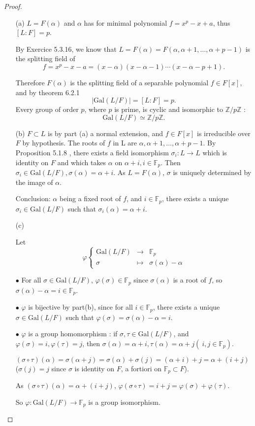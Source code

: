 \documentclass[11pt,a4paper]{article}
\newcommand{\Z}{\mathbb{Z}}
\newcommand{\F}{\mathbb{F}}
\newcommand{\Gal}{\mathrm{Gal}}
\begin{document}
\begin{proof}
\begin{enumerate}
\item[(a)]
$L=F(\alpha)$ and $\alpha$ has for minimal polynomial $f=x^p-x+a$, thus $[L:F]=p$.

By Exercice 5.3.16, we know that $L = F(\alpha) = F(\alpha, \alpha+1,\ldots,\alpha+p-1)$ is the splitting field of
$$f =x^p-x-a =  (x-\alpha)(x-\alpha-1)\cdots(x-\alpha- p+1).$$

Therefore $F(\alpha)$ is the splitting field of a separable polynomial $f \in F[x]$, and by theorem 6.2.1 $$\vert \Gal(L/F) \vert = [L:F] = p.$$
Every group of order $p$, where $p$ is prime, is cyclic and isomorphic to $\Z/p\Z$ : 
$$\Gal(L/F) \simeq \Z/p\Z.$$

\item[(b)]
 $F \subset L$ is by part (a) a normal extension, and $f \in F[x]$  is irreducible over $F$ by hypothesis. The roots of $f$ in L are $\alpha,\alpha +1, \ldots, \alpha+p-1$. By Proposition 5.1.8 , there exists a field isomorphism $\sigma_i : L \to L$ which is identity on $F$ and which takes $\alpha$ on $\alpha+i, i \in \F_p$. Then $\sigma_i \in \Gal(L/F), \sigma(\alpha) = \alpha+i$. As $L=F(\alpha)$, $\sigma$ is uniquely determined by the image of $\alpha$.
 
 Conclusion: $\alpha$ being a fixed root of $f$, and $i\in \F_p$, there exists a unique $\sigma_i \in \Gal(L/F)$ such that $ \sigma_i(\alpha) = \alpha+i$.

\item[(c)]
 
Let
$$
\varphi
\left\{
\begin{array}{ccc}
  \Gal(L/F)&\to    &\F_p  \\
  \sigma& \mapsto   &   \sigma(\alpha) - \alpha    
\end{array}
\right.
$$

$\bullet$ For all $\sigma \in \Gal(L/F)$, $\varphi(\sigma) \in \F_p$ since $\sigma(\alpha)$ is a root of $f$, so $\sigma(\alpha) - \alpha = i \in \F_p$.

 $\bullet$ $\varphi$ is bijective by part(b), since for all $i\in\F_p$, there exists a unique $\sigma \in \Gal(L/F)$ such that $\varphi(\sigma) = \sigma(\alpha) - \alpha = i$.
 
 $\bullet$ $\varphi$ is a group homomorphism : if $\sigma,\tau \in  \Gal(L/F)$, and $\varphi(\sigma) = i, \varphi(\tau) = j$, then $\sigma(\alpha) = \alpha+i, \tau(\alpha) = \alpha+j (\ i,j \in \F_p)$.
 
 $(\sigma \circ \tau)(\alpha) = \sigma(\alpha+j) = \sigma(\alpha) + \sigma(j) = (\alpha +i) +j = \alpha+(i+j)$ ($ \sigma(j) = j$ since $\sigma$ is identity on $F$, a fortiori on  $\F_p\subset F$).
 
 As $(\sigma \circ \tau)(\alpha) = \alpha+(i+j)$, $\varphi(\sigma \circ \tau) = i+j = \varphi(\sigma) + \varphi(\tau)$.
 
 So $\varphi : \Gal(L/F) \to \F_p  $ is a group isomorphism.
\end{enumerate}
\end{proof}
\end{document}
